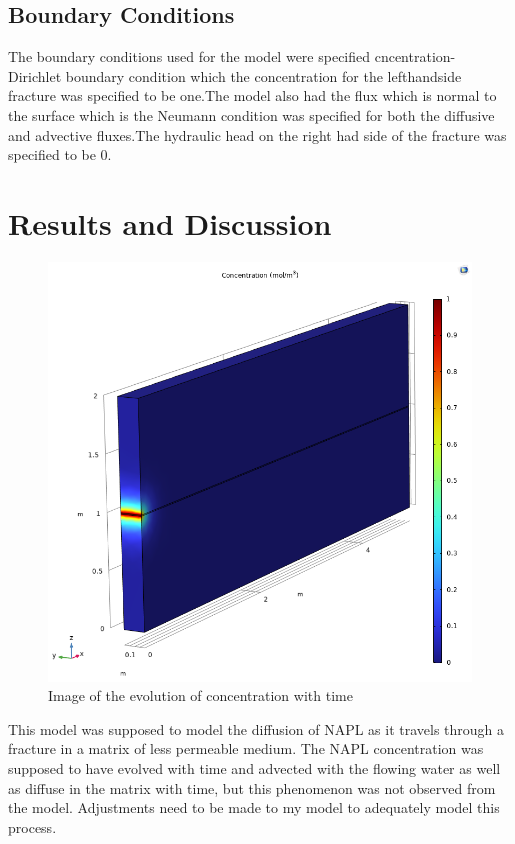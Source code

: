 \documentclass[DIV=calc, paper=a4, fontsize=11pt, twocolumn]{scrartcl}	 %
\begin{document}
\subsection*{Boundary Conditions}

The boundary conditions used for the model were specified cncentration- Dirichlet boundary condition which the concentration for the lefthandside fracture was specified to be one.The model also had the flux which is normal to the surface which is the Neumann condition was specified for both the diffusive and advective fluxes.The hydraulic head on the right had side of the fracture was specified to be 0.




\section*{Results and Discussion}
\begin{figure}
  \includegraphics[width=\linewidth]{Concentration.png}
  \caption{Image of the evolution of concentration with time}
  \label{fig3}
\end{figure}
This model was supposed to model the diffusion of NAPL as it travels through a fracture in a matrix of less permeable medium. The NAPL concentration was supposed to have evolved with time and advected with the flowing water as well as diffuse in the matrix with time, but this phenomenon was not observed from the model. Adjustments need to be made to my model to adequately model this process.
\end{document}
